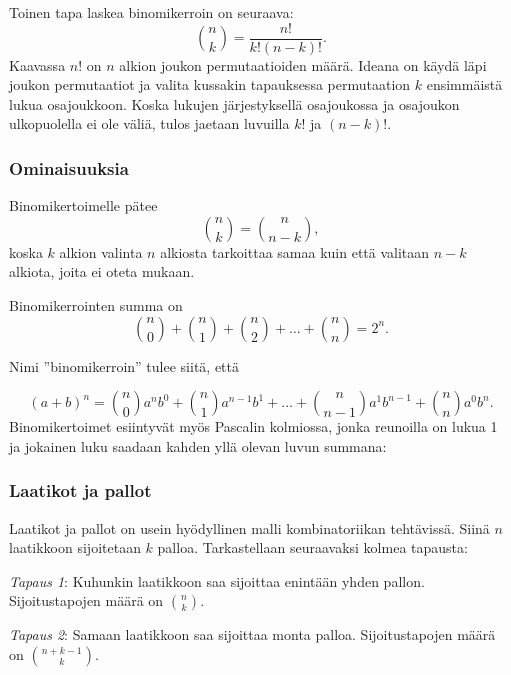 Toinen tapa laskea binomikerroin on seuraava:
\[
{n \choose k}  =  \frac{n!}{k!(n-k)!}.
\]
Kaavassa $n!$ on $n$ alkion joukon permutaatioiden määrä.
Ideana on käydä läpi joukon permutaatiot
ja valita kussakin tapauksessa
permutaation $k$ ensimmäistä lukua osajoukkoon.
Koska lukujen järjestyksellä osajoukossa
ja osajoukon ulkopuolella ei ole väliä,
tulos jaetaan luvuilla $k!$ ja $(n-k)!$.

\subsubsection{Ominaisuuksia}

Binomikertoimelle pätee
\[
{n \choose k}  =  {n \choose n-k},
\]
koska $k$ alkion valinta $n$ alkiosta
tarkoittaa samaa kuin että valitaan
$n-k$ alkiota, joita ei oteta mukaan.

Binomikerrointen summa on
\[
{n \choose 0}+{n \choose 1}+{n \choose 2}+\ldots+{n \choose n}=2^n.
\]

Nimi ''binomikerroin'' tulee siitä, että

\[ (a+b)^n =
{n \choose 0} a^n b^0 + 
{n \choose 1} a^{n-1} b^1 +
\ldots + 
{n \choose n-1} a^1 b^{n-1} +
{n \choose n} a^0 b^n. \]
Binomikertoimet esiintyvät myös Pascalin
kolmiossa, jonka reunoilla on lukua 1
ja jokainen luku saadaan
kahden yllä olevan luvun summana:
\begin{center}
\end{center}

\subsubsection{Laatikot ja pallot}

Laatikot ja pallot on usein hyödyllinen malli
kombinatoriikan tehtävissä.
Siinä $n$ laatikkoon sijoitetaan $k$ palloa.
Tarkastellaan seuraavaksi kolmea tapausta:

\textit{Tapaus 1}: Kuhunkin laatikkoon saa sijoittaa
enintään yhden pallon.
Sijoitustapojen määrä on ${n \choose k}$.

\textit{Tapaus 2}: Samaan laatikkoon saa sijoittaa
monta palloa.
Sijoitustapojen määrä on ${n+k-1 \choose k}$.

